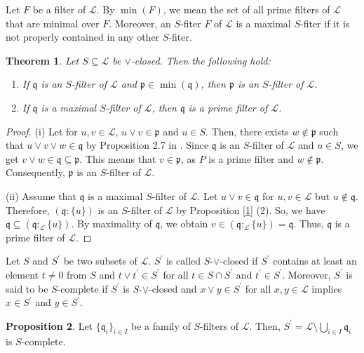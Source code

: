 \documentclass[preprint,review,10pt]{amsart}
\newtheorem{theorem}{Theorem}[section]
\theoremstyle{definition}
\newtheorem{proposition}[theorem]{Proposition}
\theoremstyle{remark}
\numberwithin{equation}{section}
\begin{document}
Let  $F$ be a filter of $\mathscr{L}$. By  $\min(F)$, we mean  the set of all prime filters of $\mathscr{L}$ that are minimal over $F$. Moreover, an $S$-fiter $F$ of $\mathscr{L}$ is a maximal $S$-fiter if it is not properly contained in any other $S$-fiter.
\begin{theorem}
Let $S \subseteq \mathscr{L}$  be   $\vee$-closed.    Then the following hold:

\begin{enumerate} 
\item[(i)]
If $\mathfrak{q}$ is an $S$-filter of $\mathscr{L}$ and $\mathfrak{p} \in \min(\mathfrak{q})$, then $\mathfrak{p}$ is an $S$-filter of $\mathscr{L}$.
\item[(ii)] If $\mathfrak{q}$ is a maximal $S$-filter of $\mathscr{L}$, then $\mathfrak{q}$ is a prime filter of $\mathscr{L}$.
\end{enumerate} 
\end{theorem}
\begin{proof}
(i) Let     for $u,v \in \mathscr{L}$, $u \vee v \in \mathfrak{p}$ and $u \in  S$. Then, there exists $w \notin \mathfrak{p}$ such that $u \vee v \vee w \in \mathfrak{q}$ by Proposition 2.7 in \cite{Atani1}. Since $\mathfrak{q}$ is an $S$-filter of $\mathscr{L}$ and $u \in S$,  we get $v \vee w \in \mathfrak{q} \subseteq  \mathfrak{p}$. This means  that $v \in \mathfrak{p}$, as $P$ is a prime filter and $w \notin \mathfrak{p}$. Consequently, $\mathfrak{p}$ is  an $S$-filter of $\mathscr{L}$.

(ii) Assume that $\mathfrak{q}$ is a maximal $S$-filter of $\mathscr{L}$. Let    $u \vee v \in \mathfrak{q}$ for $u,v \in \mathscr{L}$  but $u \notin  \mathfrak{q}$. Therefore, $(\mathfrak{q} : \{u\})$ is an $S$-filter of $\mathscr{L}$ by Proposition \ref{1} (2). So, we have $\mathfrak{q} \subseteq (\mathfrak{q} :_{\mathscr{L}} \{u\})$. By maximality of $\mathfrak{q}$, we obtain $v \in (\mathfrak{q} :_{\mathscr{L}} \{u\})=\mathfrak{q}$. Thus, $\mathfrak{q}$ is a prime filter of $\mathscr{L}$.
\end{proof}
Let $S$ and $ S^{\prime}$ be two subsets of $\mathscr{L}$.  $S^{\prime}$ is called    $S$-$\vee$-closed  if $S^{\prime}$ contains at least an element $t \neq 0$ from $S$ and $t \vee t^{\prime} \in S^{\prime}$ for all $t \in S \cap S^{\prime}$ and $t^{\prime} \in S^{\prime}$. Moreover, $S^{\prime}$ is said to be $S$-complete  if $S^{\prime}$ is $S$-$\vee$-closed and $x \vee y \in S^{\prime}$ for all $x,y \in \mathscr{L}$ implies $x \in S^{\prime}$ and $y \in S^{\prime}$.
\begin{proposition} \label{complete}
Let $\{\mathfrak{q}_i\}_{i \in I}$ be a family of  $S$-filters of $\mathscr{L}$. Then, $S^{\prime}=\mathscr{L} \setminus \bigcup_{i \in I} \mathfrak{q}_i$ is $S$-complete.
\end{proposition}
\end{document}
